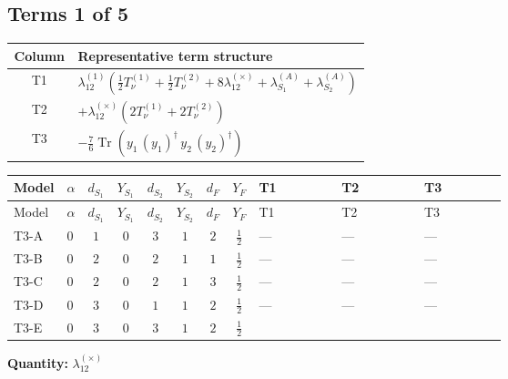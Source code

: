 \documentclass[8pt]{article}
\begin{document}
\begin{landscape}
\subsection*{Terms 1 of 5}
\begin{center}
\begin{tabular}{@{}c >{\raggedright\arraybackslash}p{0.82\linewidth}@{}}
\toprule
Column & Representative term structure \\
\midrule
T1 & \(\displaystyle {\lambda_{12}^{(1)}} \left(\frac{1}{2} T_{\nu}^{(1)}+\frac{1}{2} T_{\nu}^{(2)}+8 {\lambda_{12}^{(\times)}}+{\lambda_{S_1}^{(A)}}+{\lambda_{S_2}^{(A)}}\right)\) \\
\midrule
T2 & \(\displaystyle +{\lambda_{12}^{(\times)}} (2 T_{\nu}^{(1)}+2 T_{\nu}^{(2)})\) \\
\midrule
T3 & \(\displaystyle -\frac{7}{6} \operatorname{Tr}\!\left({y_1}\,\left({y_1}\right)^{\dagger}\,{y_2}\,\left({y_2}\right)^{\dagger}\right)\) \\
\midrule
\bottomrule
\end{tabular}
\end{center}
\smallskip
\tiny
\begin{longtable}{@{}llcccccc >{\raggedright\arraybackslash}p{0.21\linewidth} >{\raggedright\arraybackslash}p{0.21\linewidth} >{\raggedright\arraybackslash}p{0.21\linewidth}@{}}
\toprule
Model & $\alpha$ & $d_{S_1}$ & $Y_{S_1}$ & $d_{S_2}$ & $Y_{S_2}$ & $d_F$ & $Y_F$ & T1 & T2 & T3 \\
\midrule
\endfirsthead
\toprule
Model & $\alpha$ & $d_{S_1}$ & $Y_{S_1}$ & $d_{S_2}$ & $Y_{S_2}$ & $d_F$ & $Y_F$ & T1 & T2 & T3 \\
\midrule
\endhead
T3-A & $0$ & $1$ & $0$ & $3$ & $1$ & $2$ & $\frac{1}{2}$ & --- & --- & --- \\
\midrule
T3-B & $0$ & $2$ & $0$ & $2$ & $1$ & $1$ & $\frac{1}{2}$ & --- & --- & --- \\
\midrule
T3-C & $0$ & $2$ & $0$ & $2$ & $1$ & $3$ & $\frac{1}{2}$ & --- & --- & --- \\
\midrule
T3-D & $0$ & $3$ & $0$ & $1$ & $1$ & $2$ & $\frac{1}{2}$ & --- & --- & --- \\
\midrule
T3-E & $0$ & $3$ & $0$ & $3$ & $1$ & $2$ & $\frac{1}{2}$ & \scriptsize\adjustbox{max width=\linewidth}{$\begin{gathered} {\lambda_{12}^{(1)}} \left(\frac{1}{2} T_{\nu}^{(1)}+\frac{1}{2} T_{\nu}^{(2)}+8 {\lambda_{12}^{(\times)}}+{\lambda_{S_1}^{(A)}}+{\lambda_{S_2}^{(A)}}\right)\end{gathered}$} & \scriptsize\adjustbox{max width=\linewidth}{$\begin{gathered} +{\lambda_{12}^{(\times)}} (2 T_{\nu}^{(1)}+2 T_{\nu}^{(2)})\end{gathered}$} & \scriptsize\adjustbox{max width=\linewidth}{$\begin{gathered} -\frac{7}{6} \operatorname{Tr}\!\left({y_1}\,\left({y_1}\right)^{\dagger}\,{y_2}\,\left({y_2}\right)^{\dagger}\right)\end{gathered}$} \\
\midrule
\bottomrule
\end{longtable}
\clearpage
\noindent\textbf{Quantity: }$\lambda_{12}^{(\times)}$\par\smallskip

\end{landscape}
\end{document}
